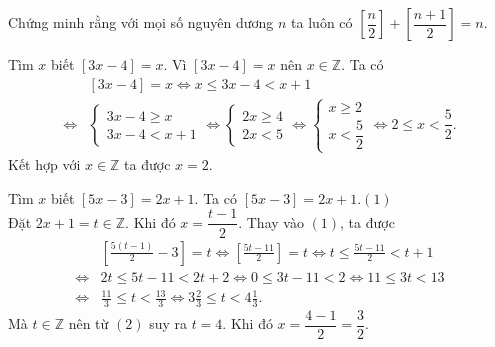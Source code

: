 \begin{vn}
	Chứng minh rằng với mọi số nguyên dương $n$ ta luôn có
	$\left[ \dfrac{n}{2} \right] + \left[ \dfrac{n + 1}{2} \right] = n$.
\end{vn}
\begin{vn}
	Tìm $x$ biết $\left[ 3x - 4 \right] = x$.
	\loigiai
	{Vì $\left[ 3x - 4 \right] = x$ nên $x\in \mathbb{Z}$. Ta có
		{\allowdisplaybreaks
			\begin{align*}
			&\left[ 3x - 4 \right] = x \Leftrightarrow x \le 3x - 4 < x + 1\\
			\Leftrightarrow& \left\{ \begin{array}{l}
			3x - 4 \ge x\\
			3x - 4 < x + 1
			\end{array} \right. \Leftrightarrow \left\{ \begin{array}{l}
			2x \ge 4\\
			2x < 5
			\end{array} \right. \Leftrightarrow \left\{ \begin{array}{l}
			x \ge 2\\
			x < \dfrac{5}{2}
			\end{array} \right. \Leftrightarrow 2 \le x < \dfrac{5}{2}.
			\end{align*}}Kết hợp với $x\in \mathbb{Z}$ ta được $x=2$.
	}
\end{vn}
\begin{vn}
Tìm $x$ biết  
$\left[ 5x-3 \right] = 2x+1$.
\loigiai
{
Ta có $\left[ 5x-3 \right] = 2x+1$.\hfill$(1)$\\
Đặt $2x+1=t\in\mathbb{Z}$. Khi đó $x=\dfrac{t-1}{2}$. Thay vào $(1)$, ta được
{\allowdisplaybreaks
\begin{align*}
&\left[ \frac{5(t - 1)}{2} - 3 \right] = t \Leftrightarrow \left[ \frac{5t - 11}{2} \right] = t \Leftrightarrow t \le \frac{5t - 11}{2} < t + 1\\
\Leftrightarrow& 2t \le 5t - 11 < 2t + 2 \Leftrightarrow 0 \le 3t - 11 < 2 \Leftrightarrow 11 \le 3t < 13\\
\Leftrightarrow& \frac{11}{3} \le t < \frac{13}{3} \Leftrightarrow 3\frac{2}{3} \le t < 4\frac{1}{3}.\tag{2}
\end{align*}}Mà $t\in\mathbb{Z}$ nên từ $(2)$ suy ra $t=4$. Khi đó $x = \dfrac{{4 - 1}}{2} = \dfrac{3}{2}$.
}
\end{vn}
